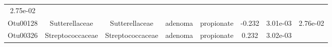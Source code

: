 \documentclass[11pt,]{article}
\begin{document}
\begin{longtable}[]{@{}cccccccc@{}}
\begin{minipage}[t]{0.08\columnwidth}
2.75e-02\strut
\end{minipage}\tabularnewline
\begin{minipage}[t]{0.08\columnwidth}\centering\strut
Otu00128\strut
\end{minipage} & \begin{minipage}[t]{0.15\columnwidth}\centering\strut
Sutterellaceae\strut
\end{minipage} & \begin{minipage}[t]{0.15\columnwidth}\centering\strut
Sutterellaceae\strut
\end{minipage} & \begin{minipage}[t]{0.08\columnwidth}\centering\strut
adenoma\strut
\end{minipage} & \begin{minipage}[t]{0.09\columnwidth}\centering\strut
propionate\strut
\end{minipage} & \begin{minipage}[t]{0.07\columnwidth}\centering\strut
-0.232\strut
\end{minipage} & \begin{minipage}[t]{0.08\columnwidth}\centering\strut
3.01e-03\strut
\end{minipage} & \begin{minipage}[t]{0.08\columnwidth}\centering\strut
2.76e-02\strut
\end{minipage}\tabularnewline
\begin{minipage}[t]{0.08\columnwidth}\centering\strut
Otu00326\strut
\end{minipage} & \begin{minipage}[t]{0.15\columnwidth}\centering\strut
Streptococcaceae\strut
\end{minipage} & \begin{minipage}[t]{0.15\columnwidth}\centering\strut
Streptococcaceae\strut
\end{minipage} & \begin{minipage}[t]{0.08\columnwidth}\centering\strut
adenoma\strut
\end{minipage} & \begin{minipage}[t]{0.09\columnwidth}\centering\strut
propionate\strut
\end{minipage} & \begin{minipage}[t]{0.07\columnwidth}\centering\strut
0.232\strut
\end{minipage} & \begin{minipage}[t]{0.08\columnwidth}\centering\strut
3.02e-03\strut
\end{minipage} & \begin{minipage}[t]{0.08\columnwidth}\centering\strut

\end{minipage}
\end{longtable}
\end{document}
